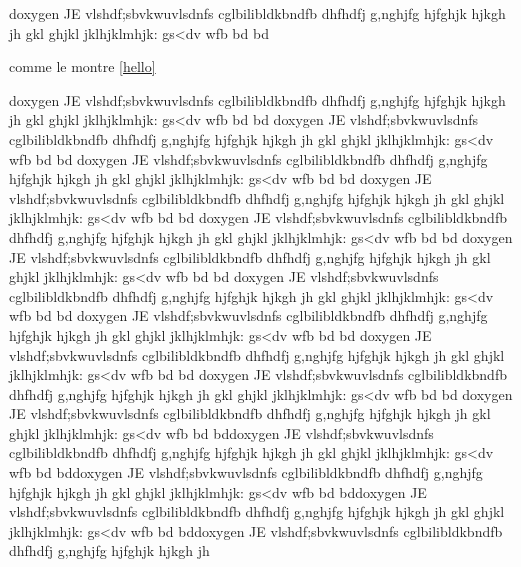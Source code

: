 

doxygen
JE vlshdf;sbvkwuvlsdnfs
cglbilibldkbndfb
dhfhdfj
g,nghjfg
hjfghjk
hjkgh
jh
gkl
ghjkl
jklhjklmhjk:
gs<dv
wfb
bd
bd

\mybox{

}
comme le montre \ref{hello}
%



doxygen
JE vlshdf;sbvkwuvlsdnfs
cglbilibldkbndfb
dhfhdfj
g,nghjfg
hjfghjk
hjkgh
jh
gkl
ghjkl
jklhjklmhjk:
gs<dv
wfb
bd
bd
doxygen
JE vlshdf;sbvkwuvlsdnfs
cglbilibldkbndfb
dhfhdfj
g,nghjfg
hjfghjk
hjkgh
jh
gkl
ghjkl
jklhjklmhjk:
gs<dv
wfb
bd
bd
doxygen
JE vlshdf;sbvkwuvlsdnfs
cglbilibldkbndfb
dhfhdfj
g,nghjfg
hjfghjk
hjkgh
jh
gkl
ghjkl
jklhjklmhjk:
gs<dv
wfb
bd
bd
doxygen
JE vlshdf;sbvkwuvlsdnfs
cglbilibldkbndfb
dhfhdfj
g,nghjfg
hjfghjk
hjkgh
jh
gkl
ghjkl
jklhjklmhjk:
gs<dv
wfb
bd
bd
doxygen
JE vlshdf;sbvkwuvlsdnfs
cglbilibldkbndfb
dhfhdfj
g,nghjfg
hjfghjk
hjkgh
jh
gkl
ghjkl
jklhjklmhjk:
gs<dv
wfb
bd
bd
doxygen
JE vlshdf;sbvkwuvlsdnfs
cglbilibldkbndfb
dhfhdfj
g,nghjfg
hjfghjk
hjkgh
jh
gkl
ghjkl
jklhjklmhjk:
gs<dv
wfb
bd
bd
doxygen
JE vlshdf;sbvkwuvlsdnfs
cglbilibldkbndfb
dhfhdfj
g,nghjfg
hjfghjk
hjkgh
jh
gkl
ghjkl
jklhjklmhjk:
gs<dv
wfb
bd
bd
doxygen
JE vlshdf;sbvkwuvlsdnfs
cglbilibldkbndfb
dhfhdfj
g,nghjfg
hjfghjk
hjkgh
jh
gkl
ghjkl
jklhjklmhjk:
gs<dv
wfb
bd
bd
doxygen
JE vlshdf;sbvkwuvlsdnfs
cglbilibldkbndfb
dhfhdfj
g,nghjfg
hjfghjk
hjkgh
jh
gkl
ghjkl
jklhjklmhjk:
gs<dv
wfb
bd
bd
doxygen
JE vlshdf;sbvkwuvlsdnfs
cglbilibldkbndfb
dhfhdfj
g,nghjfg
hjfghjk
hjkgh
jh
gkl
ghjkl
jklhjklmhjk:
gs<dv
wfb
bd
bd
doxygen
JE vlshdf;sbvkwuvlsdnfs
cglbilibldkbndfb
dhfhdfj
g,nghjfg
hjfghjk
hjkgh
jh
gkl
ghjkl
jklhjklmhjk:
gs<dv
wfb
bd
bddoxygen
JE vlshdf;sbvkwuvlsdnfs
cglbilibldkbndfb
dhfhdfj
g,nghjfg
hjfghjk
hjkgh
jh
gkl
ghjkl
jklhjklmhjk:
gs<dv
wfb
bd
bddoxygen
JE vlshdf;sbvkwuvlsdnfs
cglbilibldkbndfb
dhfhdfj
g,nghjfg
hjfghjk
hjkgh
jh
gkl
ghjkl
jklhjklmhjk:
gs<dv
wfb
bd
bddoxygen
JE vlshdf;sbvkwuvlsdnfs
cglbilibldkbndfb
dhfhdfj
g,nghjfg
hjfghjk
hjkgh
jh
gkl
ghjkl
jklhjklmhjk:
gs<dv
wfb
bd
bddoxygen
JE vlshdf;sbvkwuvlsdnfs
cglbilibldkbndfb
dhfhdfj
g,nghjfg
hjfghjk
hjkgh
jh
